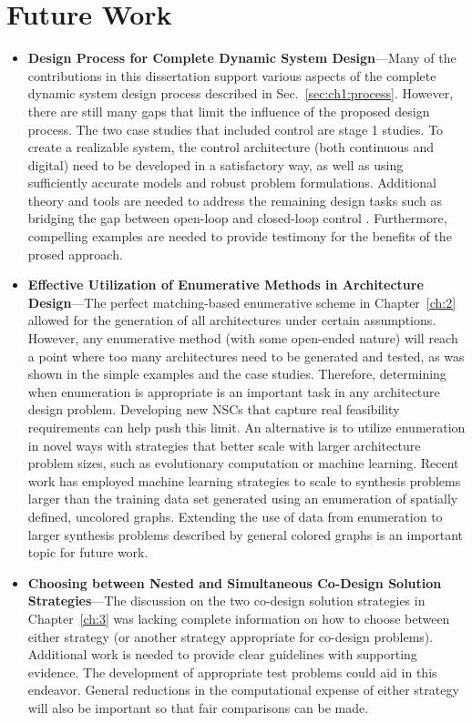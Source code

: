 \section{Future Work}

\begin{itemize}

\item \textbf{Design Process for Complete Dynamic System Design}---Many of the contributions in this dissertation support various aspects of the complete dynamic system design process described in Sec.~\ref{sec:ch1:process}.
However, there are still many gaps that limit the influence of the proposed design process.
The two case studies that included control are stage 1 studies.
To create a realizable system, the control architecture (both continuous and digital) need to be developed in a satisfactory way, as well as using sufficiently accurate models and robust problem formulations.
Additional theory and tools are needed to address the remaining design tasks such as bridging the gap between open-loop and closed-loop control \cite{Deshmukh2015a}.
Furthermore, compelling examples are needed to provide testimony for the benefits of the prosed approach.

\item \textbf{Effective Utilization of Enumerative Methods in Architecture Design}---The perfect matching-based enumerative scheme in Chapter~\ref{ch:2} allowed for the generation of all architectures under certain assumptions.
However, any enumerative method (with some open-ended nature) will reach a point where too many architectures need to be generated and tested, as was shown in the simple examples and the case studies.
Therefore, determining when enumeration is appropriate is an important task in any architecture design problem.
Developing new NSCs that capture real feasibility requirements can help push this limit.
An alternative is to utilize enumeration in novel ways with strategies that better scale with larger architecture problem sizes, such as evolutionary computation or machine learning. 
Recent work has employed machine learning strategies to scale to synthesis problems larger than the training data set generated using an enumeration \cite{GuoScitech2018} of spatially defined, uncolored graphs.
Extending the use of data from enumeration to larger synthesis problems described by general colored graphs is an important topic for future work.

\item \textbf{Choosing between Nested and Simultaneous Co-Design Solution Strategies}---The discussion on the two co-design solution strategies in Chapter~\ref{ch:3} was lacking complete information on how to choose between either strategy (or another strategy appropriate for co-design problems).
Additional work is needed to provide clear guidelines with supporting evidence.
The development of appropriate test problems could aid in this endeavor.
General reductions in the computational expense of either strategy will also be important so that fair comparisons can be made.


\end{itemize}
